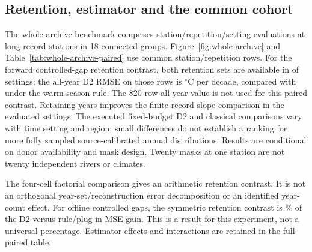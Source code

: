 \subsection{Retention, estimator and the common cohort}
The whole-archive benchmark comprises \WARepetitions{} station/repetition/setting evaluations at \WAStations{} long-record stations in 18 connected groups. Figure~\ref{fig:whole-archive} and Table~\ref{tab:whole-archive-paired} use common station/repetition rows. For the forward controlled-gap retention contrast, both retention sets are available in \CCCohortCommon{} of \CCCohortAll{} settings; the all-year D2 RMSE on those \CCCohortCommon{} rows is \CCAllCommonRMSE{} $^{\circ}$C per decade, compared with \CCWarmRMSE{} under the warm-season rule. The 820-row all-year value is not used for this paired contrast. Retaining years improves the finite-record slope comparison in the evaluated settings. The executed fixed-budget D2 and classical comparisons vary with time setting and region; small differences do not establish a ranking for more fully sampled source-calibrated annual distributions. Results are conditional on donor availability and mask design. Twenty masks at one station are not twenty independent rivers or climates.

The four-cell factorial comparison gives an arithmetic retention contrast. It is not an orthogonal year-set/reconstruction error decomposition or an identified year-count effect. For offline controlled gaps, the symmetric retention contrast is \WARetentionShare\% of the D2-versus-rule/plug-in MSE gain. This is a result for this experiment, not a universal percentage. Estimator effects and interactions are retained in the full paired table.

